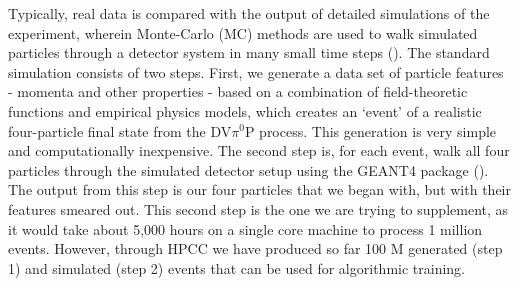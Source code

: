 Typically, real data is compared with the output of detailed simulations of the experiment, wherein Monte-Carlo (MC) methods are used to walk simulated particles through a detector system in many small time steps (\citet{PhysRevLett.115.212003, 10.1093/ptep/ptaa104}). The standard simulation consists of two steps. First, we generate a data set of particle features - momenta and other properties - based on a combination of field-theoretic functions and empirical physics models, which creates an `event' of a realistic four-particle final state from the DV$\pi^0$P process. This generation is very simple and computationally inexpensive. The second step is, for each event, walk all four particles through the simulated detector setup using the GEANT4 package (\citet{AGOSTINELLI2003250}). The output from this step is our four particles that we began with, but with their features smeared out. This second step is the one we are trying to supplement, as it would take about 5,000 hours on a single core machine to process 1 million events. However, through HPCC we have produced so far 100 M generated (step 1) and simulated (step 2) events that can be used for algorithmic training. 

